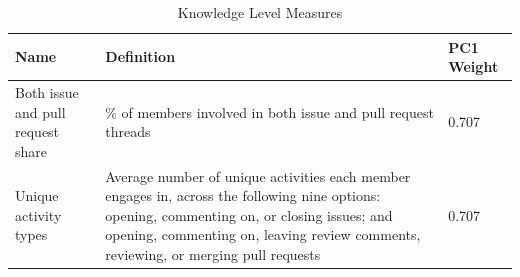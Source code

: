 \begin{longtable}{>{\raggedright\arraybackslash}p{} p{}p{}}
\caption{Knowledge Level Measures}\label{tab:shared_knowledge_metrics}\\
\toprule
\textbf{Name} & \textbf{Definition} &\textbf{PC1 Weight} \\
\midrule
\endfirsthead

\bottomrule
\endlastfoot


Both issue and pull request share & \% of members involved in both issue and pull request threads & 0.707 \\
Unique activity types & Average number of unique activities each member engages in, across the following nine options: opening, commenting on, or closing issues; and opening, commenting on, leaving review comments, reviewing, or merging pull requests & 0.707 \\
\end{longtable}

\vspace{-0.5em} %
\begin{minipage}{\textwidth}
\footnotesize
\setlength{\parskip}{0pt}
\setlength{\baselineskip}{0.9\baselineskip}
\end{minipage}

